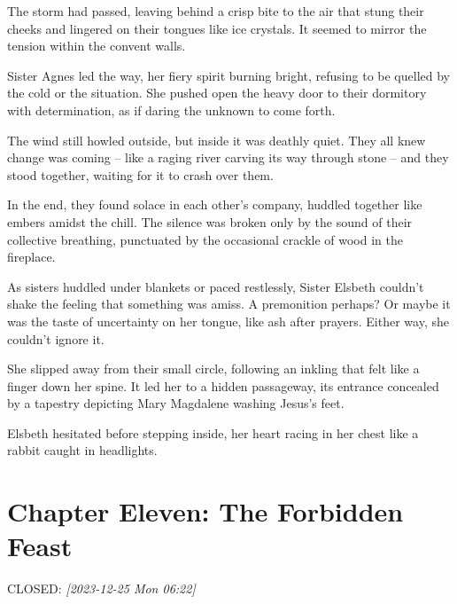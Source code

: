 \documentclass[11pt]{article}
\begin{document}
The storm had passed, leaving behind a crisp bite to the air that stung their cheeks and lingered on their tongues like ice crystals. It seemed to mirror the tension within the convent walls.

Sister Agnes led the way, her fiery spirit burning bright, refusing to be quelled by the cold or the situation. She pushed open the heavy door to their dormitory with determination, as if daring the unknown to come forth.

The wind still howled outside, but inside it was deathly quiet. They all knew change was coming – like a raging river carving its way through stone – and they stood together, waiting for it to crash over them.

In the end, they found solace in each other's company, huddled together like embers amidst the chill. The silence was broken only by the sound of their collective breathing, punctuated by the occasional crackle of wood in the fireplace.

As sisters huddled under blankets or paced restlessly, Sister Elsbeth couldn't shake the feeling that something was amiss. A premonition perhaps? Or maybe it was the taste of uncertainty on her tongue, like ash after prayers. Either way, she couldn't ignore it.

She slipped away from their small circle, following an inkling that felt like a finger down her spine. It led her  to a hidden passageway, its entrance concealed by a tapestry depicting Mary Magdalene washing Jesus's feet.

Elsbeth hesitated before stepping inside, her heart racing in her chest like a rabbit caught in headlights.

\section{Chapter Eleven: The Forbidden Feast}
\label{sec:orgd5b5ca3}
CLOSED: \textit{[2023-12-25 Mon 06:22]}
\end{document}
